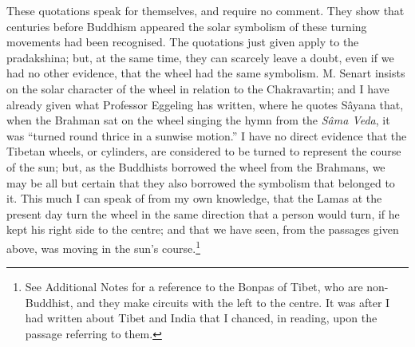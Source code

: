 \documentclass[a4paper, 11pt, oneside, polutonikogreek, english]{article}
\begin{document}
These quotations speak for themselves, and require no comment. They show that centuries before Buddhism appeared the solar symbolism of these turning movements had been recognised. The quotations just given apply to the pradakshina; but, at the same time, they can scarcely leave a doubt, even if we had no other evidence, that the wheel had the same symbolism. M. Senart insists on the solar character of the wheel in relation to the Chakravartin; and I have already given what Professor Eggeling has written, where he quotes Sâyana that, when the Brahman sat on the wheel singing the hymn from the \emph{Sâma Veda}, it was ``turned round thrice in a sunwise motion.'' I have no direct evidence that the Tibetan wheels, or cylinders, are considered to be turned to represent the course of the sun; but, as the Buddhists borrowed the wheel from the Brahmans, we may be all but certain that they also borrowed the symbolism that belonged to it. This much I can speak of from my own knowledge, that the Lamas at the present day turn the wheel in the same direction that a person would turn, if he kept his right side to the centre; and that we have seen, from the passages given above, was moving in the sun's course.\footnote{See Additional Notes for a reference to the Bonpas of Tibet, who are non-Buddhist, and they make circuits with the left to the centre. It was after I had written about Tibet and India that I chanced, in reading, upon the passage referring to them.}
\end{document}
